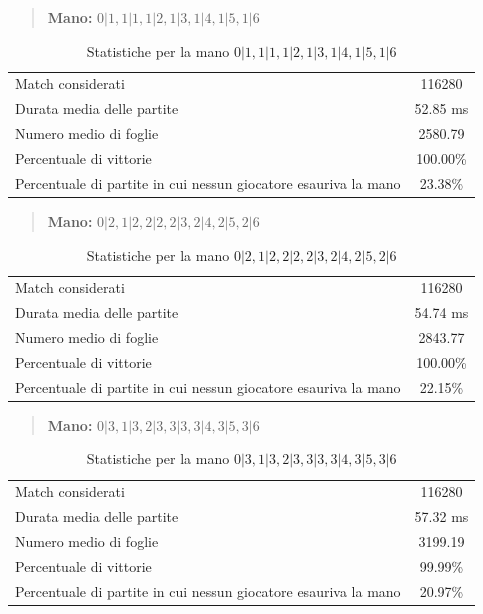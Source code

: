 \documentclass[a4paper,12pt]{report}
\begin{document}
\begin{quote}
    \textbf{Mano:} \(0|1, 1|1, 1|2, 1|3, 1|4, 1|5, 1|6\)
\end{quote}

\begin{table}[h!]
    \centering
    \begin{tabular}{|l|c|}
        \hline
        Match considerati & 116280 \\
        Durata media delle partite & 52.85 ms \\
        Numero medio di foglie &  2580.79 \\
        Percentuale di vittorie & 100.00\% \\
        Percentuale di partite in cui nessun giocatore esauriva la mano &  23.38\% \\
        \hline
    \end{tabular}
    \caption{Statistiche per la mano \(0|1, 1|1, 1|2, 1|3, 1|4, 1|5, 1|6\)}
    \label{tab:stats_tutti_1}
\end{table}


\begin{quote}
    \textbf{Mano:} \(0|2, 1|2, 2|2, 2|3, 2|4, 2|5, 2|6\)
\end{quote}

\begin{table}[h!]
    \centering
    \begin{tabular}{|l|c|}
        \hline
        Match considerati & 116280 \\
        Durata media delle partite &  54.74 ms \\
        Numero medio di foglie &  2843.77 \\
        Percentuale di vittorie & 100.00\% \\
        Percentuale di partite in cui nessun giocatore esauriva la mano &  22.15\% \\
        \hline
    \end{tabular}
    \caption{Statistiche per la mano \(0|2, 1|2, 2|2, 2|3, 2|4, 2|5, 2|6\)}
    \label{tab:stats_tutti_2}
\end{table}


\begin{quote}
    \textbf{Mano:} \(0|3, 1|3, 2|3, 3|3, 3|4, 3|5, 3|6\)
\end{quote}

\begin{table}[h!]
    \centering
    \begin{tabular}{|l|c|}
        \hline
        Match considerati & 116280 \\
        Durata media delle partite &  57.32 ms \\
        Numero medio di foglie &  3199.19 \\
        Percentuale di vittorie & 99.99\% \\
        Percentuale di partite in cui nessun giocatore esauriva la mano &  20.97\% \\
        \hline
    \end{tabular}
    \caption{Statistiche per la mano \(0|3, 1|3, 2|3, 3|3, 3|4, 3|5, 3|6\)}
    \label{tab:stats_tutti_3}
\end{table}
\end{document}
